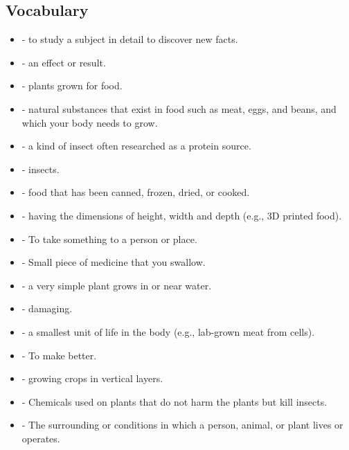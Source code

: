 \subsection{Vocabulary}
\begin{vocabbox}[title=Future Food Terms]
\begin{itemize}
    \item {}  - to study a subject in detail to discover new facts.
    \item {}  - an effect or result.
    \item {}  - plants grown for food.
    \item {}  - natural substances that exist in food such as meat, eggs, and beans, and which your body needs to grow.
    \item {}  - a kind of insect often researched as a protein source.
    \item {}  - insects.
    \item {}  - food that has been canned, frozen, dried, or cooked.
    \item {}  - having the dimensions of height, width and depth (e.g., 3D printed food).
    \item {}  - To take something to a person or place.
    \item {}  - Small piece of medicine that you swallow.
    \item {}  - a very simple plant grows in or near water.
    \item {}  - damaging.
    \item {}  - a smallest unit of life in the body (e.g., lab-grown meat from cells).
    \item {}  - To make better.
    \item {}  - growing crops in vertical layers.
    \item {}  - Chemicals used on plants that do not harm the plants but kill insects.
    \item {}  - The surrounding or conditions in which a person, animal, or plant lives or operates.
\end{itemize}
\end{vocabbox}

